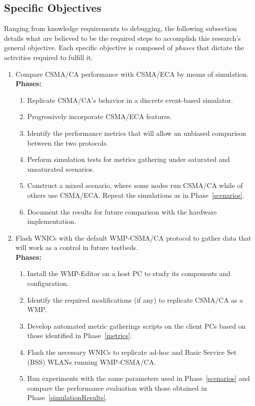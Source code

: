 \subsection{Specific Objectives}
Ranging from knowledge requirements to debugging, the following subsection details what are believed to be the required steps to accomplish this research's general objective. Each specific objective is composed of \emph{phases} that dictate the activities required to fulfill it.
\begin{enumerate}
	\item Compare CSMA/CA performance with CSMA/ECA by means of simulation.\\
	
	{\bfseries Phases:}
	\begin{enumerate}
		\item Replicate CSMA/CA's behavior in a discrete event-based simulator.
		\item Progressively incorporate CSMA/ECA features.
		\item Identify the performance metrics that will allow an unbiased comparison between the two protocols.\label{metrics}
		\item Perform simulation tests for metrics gathering under saturated and unsaturated scenarios\label{scenarios}.
		\item Construct a mixed scenario, where some nodes run CSMA/CA while of others use CSMA/ECA. Repeat the simulations as in Phase~\ref{scenarios}.
		\item Document the results for future comparison with the hardware implementation.\label{simulationResults}\\
	\end{enumerate}
	
	\item Flash WNICs with the default WMP-CSMA/CA protocol to gather data that will work as a control in future testbeds.\\
	
	{\bfseries Phases:}
	\begin{enumerate}
		\item Install the WMP-Editor on a host PC to study its components and configuration.
		\item Identify the required modifications (if any) to replicate CSMA/CA as a WMP.
		\item Develop automated metric gatherings scripts on the client PCs based on those identified in Phase~\ref{metrics}.
		\item Flash the necessary WNICs to replicate ad-hoc and Basic Service Set (BSS) WLANs running WMP-CSMA/CA.
		\item Run experiments with the same parameters used in Phase~\ref{scenarios} and compare the performance evaluation with those obtained in Phase~\ref{simulationResults}.\label{WMPExperiment}\\
	\end{enumerate}


\end{enumerate}
